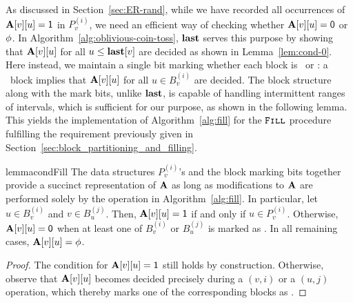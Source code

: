 As discussed in Section~\ref{sec:ER-rand}, while we have recorded all occurrences of $\mathbf{A}[v][u]=\mathsf{1}$ in $P_v^{(i)}$,
we need an efficient way of checking whether $\mathbf{A}[v][u] = \mathsf{0}$ or $\phi$. In Algorithm~\ref{alg:oblivious-coin-toss},
$\mathbf{last}$ serves this purpose by showing that $\mathbf{A}[v][u]$ for all $u \leq \mathbf{last}[v]$ are decided as shown in Lemma~\ref{lem:cond-0}.
Here instead, we maintain a single bit marking whether each block is \filled~or \unfilled:
a \filled~block implies that $\mathbf{A}[v][u]$ for all $u \in B^{(i)}_v$ are decided.
The block structure along with the mark bits, unlike $\mathbf{last}$, is capable of handling intermittent ranges of intervals,
which is sufficient for our purpose, as shown in the following lemma.
This yields the implementation of Algorithm~\ref{alg:fill} for the $\texttt{\textsc{Fill}}$ procedure
fulfilling the requirement previously given in Section~\ref{sec:block_partitioning_and_filling}.

\begin{restatable}{lemma}{condFill}\label{lem:cond-0-fill}
The data structures $P_v^{(i)}$'s and the block marking bits together provide a succinct representation of $\mathbf{A}$ as long as modifications to $\mathbf{A}$ are performed solely by the  operation in Algorithm~\ref{alg:fill}. In particular, let $u \in B^{(i)}_v$ and $v \in B_u^{(j)}$. Then, $\mathbf{A}[v][u]=\mathsf{1}$ if and only if $u \in P_v^{(i)}$. Otherwise, $\mathbf{A}[v][u]=\mathsf{0}$ when at least one of $B^{(i)}_v$ or $B_u^{(j)}$ is marked as \filled. In all remaining cases, $\mathbf{A}[v][u]=\phi$.
\end{restatable}
\begin{proof}
The condition for $\mathbf{A}[v][u]=\mathsf{1}$ still holds by construction. Otherwise, observe that $\mathbf{A}[v][u]$ becomes decided precisely during a $(v,i)$ or a $(u,j)$ operation, which thereby marks one of the corresponding blocks as \filled.
\end{proof}


